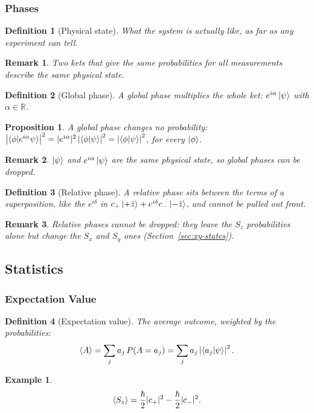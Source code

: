 \documentclass{article}
\newtheorem{definition}{Definition}
\newtheorem*{example}{Example}
\newtheorem{remark}{Remark}
\newtheorem{proposition}{Proposition}
\begin{document}
\subsubsection{Phases}
\begin{definition}[Physical state]
    What the system is actually like, as far as any experiment can tell.
\end{definition}
\begin{remark}
    Two kets that give the same probabilities for all measurements describe the same physical state.
\end{remark}
\begin{definition}[Global phase]
    A global phase multiplies the whole ket: $e^{i\alpha}\ket{\psi}$ with $\alpha \in \mathbb{R}$.
\end{definition}
\begin{proposition}
    A global phase changes no probability: $\left|\braket{\phi|e^{i\alpha}\psi}\right|^2 = |e^{i\alpha}|^2\left|\braket{\phi|\psi}\right|^2 = \left|\braket{\phi|\psi}\right|^2$, for every $\ket{\phi}$.
\end{proposition}
\begin{remark}
    $\ket{\psi}$ and $e^{i\alpha}\ket{\psi}$ are the same physical state, so global phases can be dropped.
\end{remark}
\begin{definition}[Relative phase]
    A relative phase sits between the terms of a superposition, like the $e^{i\delta}$ in $c_+\ket{+\hat{z}} + e^{i\delta}c_-\ket{-\hat{z}}$, and cannot be pulled out front.
\end{definition}
\begin{remark}
    Relative phases cannot be dropped: they leave the $S_z$ probabilities alone but change the $S_x$ and $S_y$ ones (Section~\ref{sec:xy-states}).
\end{remark}

\subsection{Statistics}
\subsubsection{Expectation Value}
\begin{definition}[Expectation value]
    The average outcome, weighted by the probabilities:
    \begin{equation}
        \braket{A} = \sum_j a_j\,P(A = a_j) = \sum_j a_j\left|\braket{a_j|\psi}\right|^2.
    \end{equation}
\end{definition}
\begin{example}
    \[\braket{S_z} = \frac{\hbar}{2}|c_+|^2 - \frac{\hbar}{2}|c_-|^2.\]
\end{example}
\end{document}
